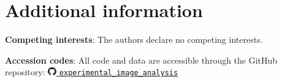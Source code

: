 \documentclass[fleqn,10pt]{wlscirep}
\begin{document}
\section*{Additional information}
\textbf{Competing interests}: The authors declare no competing interests.

\noindent \textbf{Accession codes}: All code and data are accessible through the GitHub repository: \href{https://github.com/JeroFotinos/experimental_image_analysis}{\includegraphics[width=1em]{images/github-mark.pdf} \nolinkurl{experimental_image_analysis}}


%
\listoftodos
\end{document}
